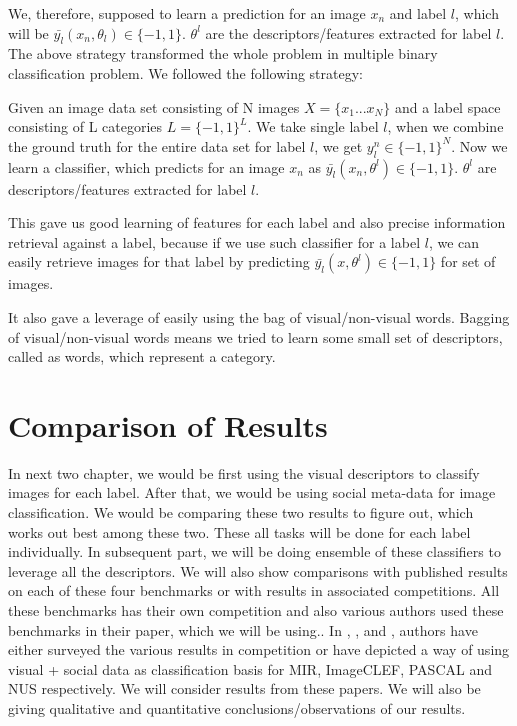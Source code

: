 We, therefore, supposed to learn a prediction for an image $x_n$ and label $l$, which will be $\bar{y_l} (x_n,\theta_l)\in\{-1,1\}$.  $\theta^l$ are the descriptors/features extracted for label $l$. The above strategy transformed the whole problem in multiple binary classification problem. We followed the following strategy:

  Given an image data set consisting of N images $X = \{x_1 ...x_N\}$ and a label space consisting of L categories $L = \{-1, 1\}^L$. We take single label  $l$,  when we combine the ground truth for the entire data set for label $l$, we get $y^n_l \in \{-1,1\}^N$. Now we learn a classifier, which predicts for an image $x_n$ as $\bar{y_l} (x_n,\theta^l)\in\{-1,1\} $. $\theta^l$ are  descriptors/features extracted for label $l$.
  
	 This gave us good learning of features for each label and also precise information retrieval against a label, because if we use such classifier for a label $l$, we can easily retrieve images for that label by predicting $\bar{y_l} (x,\theta^l)\in\{-1,1\}$ for set of images.
	 
	 It also gave a leverage of easily using the bag of visual/non-visual words. Bagging of visual/non-visual words means we tried to learn some small set of descriptors, called as words, which represent a category.   


\section{Comparison of Results}

In next two chapter, we would be first using the visual descriptors to classify images for each label. After that, we would be using social meta-data for image classification. We  would be comparing these two results to figure out, which works out best among these two. These all tasks will be done for each label individually.
In subsequent part, we will be doing ensemble of these classifiers to leverage all the descriptors. We will also show comparisons with published results on each of these four benchmarks or with results in associated competitions. All these benchmarks has their own competition and also various authors used these benchmarks in their paper, which we will be using.. In \citet*{MIRresults}, \citet*{CLEF} ,\citet*{PASCAL} and  \citet*{NUS}, authors have either surveyed the various results in competition or have depicted a way of using visual + social data as classification basis for MIR, ImageCLEF, PASCAL and NUS respectively. We will consider results from these papers. We will also be giving qualitative and quantitative conclusions/observations  of our results.
 
